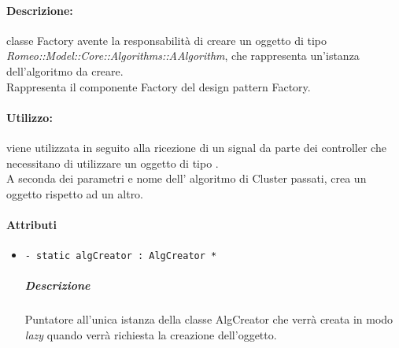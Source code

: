 	\paragraph{Descrizione:} classe Factory avente la responsabilità di creare un oggetto di tipo \textsl{Romeo::Model::Core::Algorithms::AAlgorithm}, che rappresenta un’istanza dell’algoritmo da creare.
\\Rappresenta il componente Factory del design pattern\g{} Factory.
	\paragraph{Utilizzo:} viene utilizzata in seguito alla ricezione di un signal\g{} da parte dei controller che necessitano di utilizzare un oggetto di tipo .
\\A seconda dei parametri e nome dell’ algoritmo di Cluster\g{} passati, crea un oggetto rispetto ad un altro.
	\paragraph{Attributi}
		\begin{itemize}
			\item \color{teal} \verb!- static algCreator : AlgCreator *!
			\color{black}
			\subparagraph{Descrizione} Puntatore all’unica istanza della classe AlgCreator che verrà creata in modo \emph{lazy} quando verrà richiesta la creazione dell’oggetto.
		\end{itemize}
